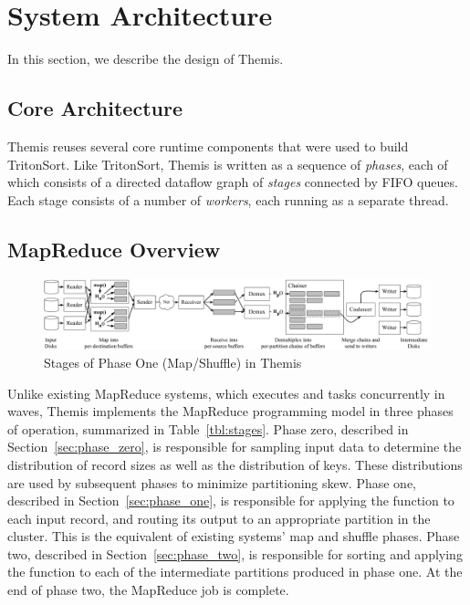 \section{System Architecture}
\label{themis:sec:design}

In this section, we describe the design of Themis.

\subsection{Core Architecture}
\label{sec:overview}

Themis reuses several core runtime components that were used to build
TritonSort.  Like TritonSort, Themis is written as a sequence of
\emph{phases}, each of which consists of a directed dataflow graph of
\emph{stages} connected by FIFO queues.  Each stage consists of a number of
\emph{workers}, each running as a separate thread.

\subsection{MapReduce Overview}

\begin{figure}
\centering
\includegraphics[width=\textwidth]{themis/figures/detailed_phase_one.pdf}
\caption{\label{fig:phase_one} Stages of Phase One (Map/Shuffle) in Themis}
\end{figure}

Unlike existing MapReduce systems, which executes \map and \reduce tasks
concurrently in waves, Themis implements the MapReduce programming model in
three phases of operation, summarized in Table~\ref{tbl:stages}.  Phase zero,
described in Section~\ref{sec:phase_zero}, is responsible for sampling input
data to determine the distribution of record sizes as well as the distribution
of keys.  These distributions are used by subsequent phases to minimize
partitioning skew.  Phase one, described in Section~\ref{sec:phase_one}, is
responsible for applying the \map function to each input record, and routing
its output to an appropriate partition in the cluster.  This is the equivalent
of existing systems' map and shuffle phases.  Phase two, described in
Section~\ref{sec:phase_two}, is responsible for sorting and applying the
\reduce function to each of the intermediate partitions produced in phase one.
At the end of phase two, the MapReduce job is complete.

